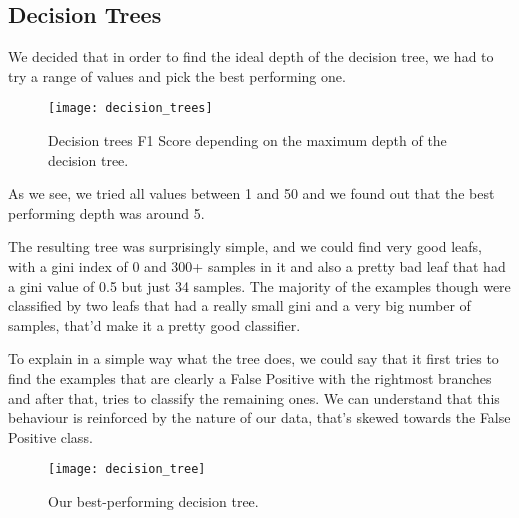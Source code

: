 
\subsection{Decision Trees}%
\label{sub:decision-trees}
We decided that in order to find the ideal depth of the decision tree, we had to try a range of values and pick the best performing one.

\begin{figure}[H]
    \centering
    \texttt{[image: decision\_trees]}
    \caption{Decision trees F1 Score depending on the maximum depth of the decision tree.}%
    \label{fig:decision_trees_acc}
\end{figure}

As we see, we tried all values between 1 and 50 and we found out that the best performing depth was around 5. 

The resulting tree was surprisingly simple, and we could find very good leafs, with a gini index of 0 and 300+ samples in it and also a pretty bad leaf that had a gini value of 0.5 but just 34 samples. The majority of the examples though were classified by two leafs that had a really small gini and a very big number of samples, that'd make it a pretty good classifier.

To explain in a simple way what the tree does, we could say that it first tries to find the examples that are clearly a False Positive with the rightmost branches and after that, tries to classify the remaining ones. We can understand that this behaviour is reinforced by the nature of our data, that's skewed towards the False Positive class.

\begin{landscape}
\null
\vfill
\begin{figure}[H]
    \centering
    \texttt{[image: decision\_tree]}
    \caption{Our best-performing decision tree.}%
    \label{fig:decision_trees}
\end{figure}
\vfill
\null
\end{landscape}


